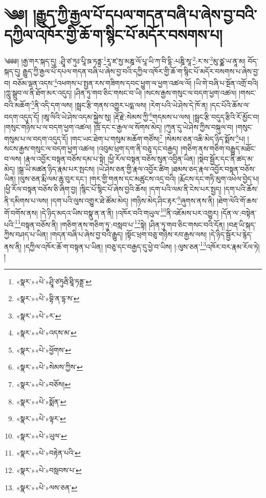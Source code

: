 \chapter{༄༅། །རྒྱུད་ཀྱི་རྒྱལ་པོ་དཔལ་གདན་བཞི་པ་ཞེས་བྱ་བའི་དཀྱིལ་འཁོར་གྱི་ཆོ་ག་སྙིང་པོ་མདོར་བསགས་པ།}༄༅༅། །རྒྱ་གར་སྐད་དུ། :ཤྲཱི་ཙ་ཏུཿ་པཱི་ཋ་ཏནྟྲ་\footnote{«སྣར་»«པེ་»ཤྲཱི་ཙཏུརྦི་ཐཱི་ཏནྡྲ་}རཱ་ཛ་སྱ་མཎྜ་ལོ་པཱ་ཡི་ཀ་བི་དྷི་:པཎྜི་སཱ་\footnote{«སྣར་»«པེ་»བྷི་ན་དྷ་ས་}:ར་ས་\footnote{«སྣར་»«པེ་»ར་}མུ་ཙྪ་ཡ་ནཱ་མ། བོད་སྐད་དུ། རྒྱུད་ཀྱི་རྒྱལ་པོ་དཔལ་གདན་བཞི་པ་ཞེས་བྱ་བའི་དཀྱིལ་འཁོར་གྱི་ཆོ་ག་སྙིང་པོ་མདོར་བསགས་པ་ཞེས་བྱ་བ། བཅོམ་ལྡན་འདས་\footnote{«སྣར་»«པེ་»འདས་མ་}འཕགས་པ་སྤྱན་རས་གཟིགས་དབང་ཕྱུག་ལ་ཕྱག་འཚལ་ལོ། །ཡི་གེ་བཞི་པ་སྔོན་འགྲོ་བའི། །ཀླུ་སྒྲུབ་ལ་ནི་ཐོག་མར་འདུད། །ཤིན་ཏུ་གབ་ཅིང་གསང་བ་ཡི། །སངས་རྒྱས་གསུང་ལ་བདག་ཕྱག་འཚལ། །གསང་བའི་མཆོག་\footnote{«སྣར་»«པེ་»ཕྱོགས་}ནི་འདི་དག་ལས། །སྦྲང་རྩི་གནས་འགྱུར་པདྨ་ལས། །རེག་པའི་ཡེ་ཤེས་དེ་ཁོ་ན། །དང་པོའི་ཆོས་ལ་བདག་འདུད་དོ། །ཨཱ་ལིའི་ཡེ་ཤེས་འདམ་སྐྱེས་སུ། །རྡོ་རྗེ་:སེམས་ཀྱི་\footnote{«སྣར་»«པེ་»སེམས་ཀྱིས་}གདམས་པ་ལས། །སྦྲང་རྩི་བདུད་རྩིའི་རོ་མྱོང་བ། །གསུང་གཉིས་པ་ལ་བདག་ཕྱག་འཚལ། །ཁྲོ་དང་ང་རྒྱལ་ལ་སོགས་མེད། །ཀུན་དུ་ཡེ་ཤེས་ཀྱིས་བསྐུལ་བ། །གསུང་གསུམ་པ་ལ་བདག་འདུད་དོ། །གང་ཡང་ཐེག་པ་གསུམ་མཆོག་གཙོས།\footnote{«སྣར་»«པེ་»བཅོས།} །སེམས་ཅན་འཆི་མེད་ཉིད་སྨོས་\footnote{«སྣར་»«པེ་»སྨོན་}པ། །སངས་རྒྱས་གསུང་ལ་བདག་ཕྱག་འཚལ། །འབུམ་ཕྲག་དག་ནི་བཅུ་དང་བརྒྱད། །གཅིག་ནས་གཅིག་བརྒྱུད་མཐོང་བ་ལས། །རྣལ་འབྱོར་བསྟན་བཅོས་དམ་པ་སྟེ། །ཕྱི་རོལ་བསྟན་བཅོས་སུན་འབྱིན་ཡིན། །སྡེབ་སྦྱོར་དང་ནི་ཚད་མ་མེད། །སྒྲ་ཡི་མཚན་ཉིད་རྣམ་པར་སྤངས། །ཡེ་ཤེས་ཅན་གྱི་རྣལ་འབྱོར་ཚིག །ཐམས་ཅད་རྣལ་འབྱོར་བསྟན་བཅོས་ཡིན། །ལུས་ཅན་རྨི་ལམ་ཆུ་བུར་དང་། །གར་གྱི་གནས་དང་མཚུངས་འདྲ་བའི། །རྨོངས་དང་གཏི་མུག་འཕེལ་བྱེད་པ། །ཕྱི་རོལ་བསྟན་བཅོས་ཅི་ཞིག་བྱ། །སྙིང་པོ་སྙིང་པོ་ཞེས་བྱའི་ཆོས། །དག་པའི་ལམ་ནི་ངེས་པར་སྤྱད། །དག་པའི་ཆོས་ནི་དམིགས་པ་ལས། །དག་པའི་ལུས་འགྱུར་ཐེ་ཚོམ་མེད། །གཉིས་མེད་ཤིང་རྟར་\footnote{«སྣར་»«པེ་»ལྟར་}ཞུགས་ནས་ནི། །ཐེག་ལེའི་གོ་ཆས་གོ་བགོས་ནས། །དེ་ཉིད་མདའ་ཡིས་བསྣུ་ན་ན་ནི། །འཁོར་བའི་གཡུལ་\footnote{«སྣར་»«པེ་»ཡུལ་}ནི་འཇོམས་པར་འགྱུར། །དོན་ལ་:བསྟེན་པའི་\footnote{«སྣར་»«པེ་»བརྟེན་པའི་}བསྟན་བཅོས་ནི། །གཅིག་ནས་གཅིག་ཏུ་:བསླབ་པ་\footnote{«སྣར་»«པེ་»བསླབས་པ་}སྟེ། །ཤིན་ཏུ་གབ་ཅིང་གསང་བའི་དོན། །བརྡ་ཡི་སྐད་ཀྱིས་བཤད་པ་ཡིན། །གདན་བཞི་པ་ཞེས་བྱ་བའི་རྒྱུད། །སྟོང་ཕྲག་བཅུ་གཉིས་རབ་རྒྱས་ལས། །དེ་ཉིད་སྦྱོར་པ་རྙེད་ནས་ནི། །དཀྱིལ་འཁོར་ཆོ་ག་བསྟན་པ་ཡིན། །བཅུ་དང་བརྒྱད་དུ་ཕྱེ་བ་ཡིས། །:ལུས་ཅན་\footnote{«སྣར་»«པེ་»ལས་ཅན་}འཁོར་བར་རྣམ་རོལ་ཏེ། །
